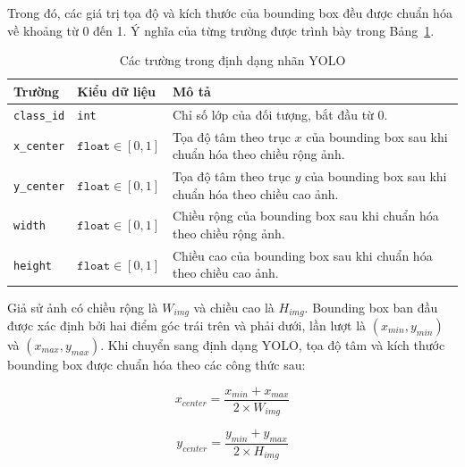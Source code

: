 \documentclass[13pt,a4paper]{report}
\begin{document}
Trong đó, các giá trị tọa độ và kích thước của bounding box đều được chuẩn hóa về khoảng từ 0 đến 1. Ý nghĩa của từng trường được trình bày trong Bảng~\ref{tab:yolo_label_format}.

\captionsetup[table]{
	font=large,
	labelfont=bf,
	textfont=bf,
	justification=centering
}
\begin{table}[h]
	\centering
	\caption{Các trường trong định dạng nhãn YOLO}
	\label{tab:yolo_label_format}
	\renewcommand{\arraystretch}{1.6}
	\setlength{\tabcolsep}{8pt}
	{\large
		\begin{tabular}{|p{3cm}|p{3.2cm}|p{8cm}|}
			\hline
			\textbf{Trường} & \textbf{Kiểu dữ liệu} & \textbf{Mô tả} \\
			\hline
			\texttt{class\_id} 
			& \texttt{int} 
			& Chỉ số lớp của đối tượng, bắt đầu từ 0. \\
			\hline
			
			\texttt{x\_center} 
			& \(\texttt{float} \in [0,1]\) 
			& Tọa độ tâm theo trục \(x\) của bounding box sau khi chuẩn hóa theo chiều rộng ảnh. \\
			\hline
			
			\texttt{y\_center} 
			& \(\texttt{float} \in [0,1]\) 
			& Tọa độ tâm theo trục \(y\) của bounding box sau khi chuẩn hóa theo chiều cao ảnh. \\
			\hline
			
			\texttt{width} 
			& \(\texttt{float} \in [0,1]\) 
			& Chiều rộng của bounding box sau khi chuẩn hóa theo chiều rộng ảnh. \\
			\hline
			
			\texttt{height} 
			& \(\texttt{float} \in [0,1]\) 
			& Chiều cao của bounding box sau khi chuẩn hóa theo chiều cao ảnh. \\
			\hline
		\end{tabular}
	}
\end{table}
Giả sử ảnh có chiều rộng là $W_{img}$ và chiều cao là $H_{img}$. Bounding box ban đầu được xác định bởi hai điểm góc trái trên và phải dưới, lần lượt là $(x_{min}, y_{min})$ và $(x_{max}, y_{max})$. Khi chuyển sang định dạng YOLO, tọa độ tâm và kích thước bounding box được chuẩn hóa theo các công thức sau:

\begin{equation}
	x_{center} = \frac{x_{min} + x_{max}}{2 \times W_{img}}
\end{equation}

\begin{equation}
	y_{center} = \frac{y_{min} + y_{max}}{2 \times H_{img}}
\end{equation}
\end{document}
